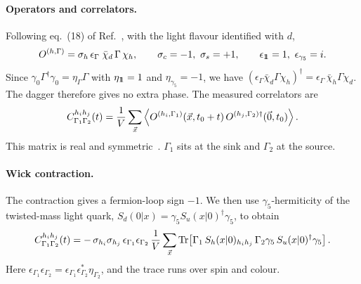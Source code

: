 \paragraph{Operators and correlators.}
Following eq.~(18) of Ref.~\cite{baron2011computing}, with the light flavour identified with $d$,
\begin{equation}
  O^{(h,\Gamma)} = \sigma_h\,\epsilon_\Gamma\;\bar\chi_d\,\Gamma\,\chi_h ,
  \qquad
  \sigma_c=-1,\ \sigma_s=+1,\qquad \epsilon_{\id}=1,\ \epsilon_{\gamma_5}=i .
\end{equation}
Since $\gamma_0\Gamma^\dagger\gamma_0=\eta_\Gamma\Gamma$ with $\eta_{1\!\!1}=1$ and $\eta_{\gamma_5}=-1$,
we have $(\epsilon_\Gamma\bar\chi_d\Gamma\chi_h)^\dagger=\epsilon_\Gamma\,\bar\chi_h\Gamma\chi_d$.
The dagger therefore gives no extra phase. The measured correlators are
\begin{equation}
  C^{h_ih_j}_{\Gamma_1\Gamma_2}(t) = \frac1V\sum_{\vec x}
  \left\langle O^{(h_i,\Gamma_1)}(\vec x,t_0+t)\,O^{(h_j,\Gamma_2)\dagger}(\vec 0,t_0) \right\rangle .
\end{equation}
This matrix is real and symmetric~\cite{baron2011computing}. $\Gamma_1$ sits at the sink and $\Gamma_2$ at the source.

\paragraph{Wick contraction.}
The contraction gives a fermion-loop sign $-1$.
We then use $\gamma_5$-hermiticity of the twisted-mass light quark,
$S_d(0|x)=\gamma_5 S_u(x|0)^\dagger\gamma_5$, to obtain
\begin{equation}
  C^{h_ih_j}_{\Gamma_1\Gamma_2}(t) = -\,\sigma_{h_i}\sigma_{h_j}\,\epsilon_{\Gamma_1}\epsilon_{\Gamma_2}\,
  \frac1V\sum_{\vec x}
  \operatorname{Tr}\!\left[\Gamma_1\,S_h(x|0)_{h_ih_j}\,\Gamma_2\gamma_5\,S_u(x|0)^\dagger\gamma_5\right] .
  \label{eq:hm:wick}
\end{equation}
Here $\epsilon_{\Gamma_1}\epsilon_{\Gamma_2}=\epsilon_{\Gamma_1}\epsilon^*_{\Gamma_2}\eta_{\Gamma_2}$,
and the trace runs over spin and colour.


